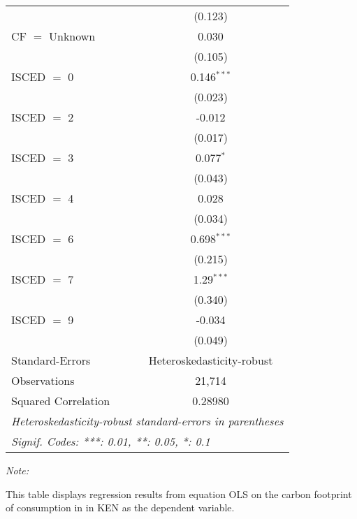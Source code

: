 \begin{table}[htbp!]
\begin{adjustbox}{width = 1\textwidth, max height = 0.95\textheight, center}
\begin{threeparttable}[b]
\begin{tabular}{lc}
                                & (0.123)\\   
            CF $=$ Unknown      & 0.030\\   
                                & (0.105)\\   
            ISCED $=$ 0         & 0.146$^{***}$\\   
                                & (0.023)\\   
            ISCED $=$ 2         & -0.012\\   
                                & (0.017)\\   
            ISCED $=$ 3         & 0.077$^{*}$\\   
                                & (0.043)\\   
            ISCED $=$ 4         & 0.028\\   
                                & (0.034)\\   
            ISCED $=$ 6         & 0.698$^{***}$\\   
                                & (0.215)\\   
            ISCED $=$ 7         & 1.29$^{***}$\\   
                                & (0.340)\\   
            ISCED $=$ 9         & -0.034\\   
                                & (0.049)\\   
            \midrule 
            Standard-Errors     & Heteroskedasticity-robust \\   
            Observations        & 21,714\\  
            Squared Correlation & 0.28980\\  
            \midrule \midrule
            \multicolumn{2}{l}{\emph{Heteroskedasticity-robust standard-errors in parentheses}}\\
            \multicolumn{2}{l}{\emph{Signif. Codes: ***: 0.01, **: 0.05, *: 0.1}}\\
         \end{tabular}
         
         \begin{tablenotes}\item \medskip \textit{Note:}
            \item This table displays regression results from equation OLS on the carbon footprint of consumption in  in KEN as the dependent variable.  
         \end{tablenotes}
      \end{threeparttable}
   \end{adjustbox}
\end{table}


